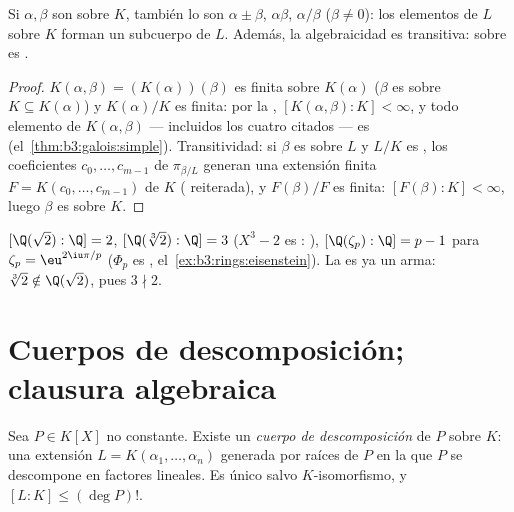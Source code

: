 \begin{corollary}\label{cor:b3:galois:algclosed}
Si $\alpha, \beta$ son 
sobre $K$, también lo son $\alpha \pm
\beta$, $\alpha\beta$, $\alpha/\beta$ ($\beta \ne 0$): los elementos de
$L$  sobre $K$ forman un
subcuerpo de $L$. Además, la algebraicidad es transitiva:
 sobre
 es
.
\end{corollary}

\begin{proof}
$K(\alpha, \beta) = (K(\alpha))(\beta)$ es finita sobre $K(\alpha)$
($\beta$ es  sobre
$K \subseteq K(\alpha)$) y $K(\alpha)/K$ es finita: por la
,
$[K(\alpha,\beta):K] <
\infty$, y todo elemento de $K(\alpha, \beta)$ --- incluidos los cuatro
citados --- es 
(el~\cref{thm:b3:galois:simple}). Transitividad: si $\beta$ es
 sobre $L$ y $L/K$ es
, los coeficientes
$c_0, \dots, c_{m-1}$ de $\pi_{\beta/L}$ generan una extensión finita
$F = K(c_0, \dots,
c_{m-1})$ de $K$ (
reiterada), y $F(\beta)/F$ es finita: $[F(\beta):K] < \infty$, luego
$\beta$ es  sobre
$K$.
\end{proof}

\begin{example}\label{ex:b3:galois:degrees}
$[\Q(\sqrt2):\Q] = 2$, $[\Q(\sqrt[3]2):\Q] = 3$ ($X^3 - 2$ es
:
), $[\Q(\zeta_p):\Q] = p - 1$
para $\zeta_p = \eu^{2\iu\pi/p}$ ($\Phi_p$ es
,
el~\cref{ex:b3:rings:eisenstein}). La
 es ya un arma:
$\sqrt[3]2 \notin \Q(\sqrt2)$, pues $3 \nmid 2$.
\end{example}

\section{Cuerpos de descomposición; clausura algebraica}

\begin{theorem}\label{thm:b3:galois:splitting}
Sea $P \in K[X]$ no constante. Existe un \emph{cuerpo de
descomposición} de $P$ sobre $K$: una
extensión $L =
K(\alpha_1, \dots, \alpha_n)$ generada por raíces de $P$ en la que $P$
se descompone en factores lineales. Es único salvo $K$-isomorfismo, y
$[L:K] \leq (\deg P)!$.
\end{theorem}


